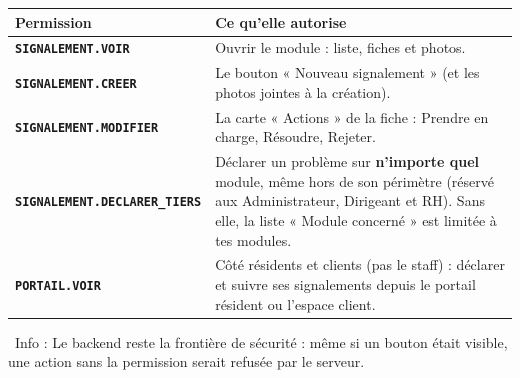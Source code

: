 \documentclass[12pt,a4paper]{article}
\newcommand{\info}[1]{\par\noindent\textcolor{lagoon}{\faInfoCircle\ Info : #1}\par}
\begin{document}
\begin{center}
\begin{longtable}{>{\bfseries}p{5.2cm}p{9.5cm}}
\toprule
\textbf{Permission} & \textbf{Ce qu'elle autorise} \\
\midrule
\endhead
\texttt{SIGNALEMENT.VOIR} & Ouvrir le module : liste, fiches et photos. \\
\addlinespace
\texttt{SIGNALEMENT.CREER} & Le bouton « Nouveau signalement » (et les photos jointes à la création). \\
\addlinespace
\texttt{SIGNALEMENT.MODIFIER} & La carte « Actions » de la fiche : Prendre en charge, Résoudre, Rejeter. \\
\addlinespace
\texttt{SIGNALEMENT.DECLARER\_TIERS} & Déclarer un problème sur \textbf{n'importe quel} module, même hors de son périmètre (réservé aux Administrateur, Dirigeant et RH). Sans elle, la liste « Module concerné » est limitée à tes modules. \\
\addlinespace
\texttt{PORTAIL.VOIR} & Côté résidents et clients (pas le staff) : déclarer et suivre ses signalements depuis le portail résident ou l'espace client. \\
\bottomrule
\end{longtable}
\end{center}

\info{Le backend reste la frontière de sécurité : même si un bouton était visible, une action sans la permission serait refusée par le serveur.}

\vspace{1cm}
\begin{center}
\end{center}
\end{document}
